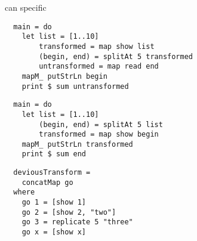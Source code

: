 % 
can
specific
% 
%   
%   
% 
\begin{lstlisting}
  main = do
    let list = [1..10]
        transformed = map show list
        (begin, end) = splitAt 5 transformed
        untransformed = map read end
    mapM_ putStrLn begin
    print $ sum untransformed
\end{lstlisting}
\begin{lstlisting}
  main = do
    let list = [1..10]
        (begin, end) = splitAt 5 list
        transformed = map show begin
    mapM_ putStrLn transformed
    print $ sum end
\end{lstlisting}
\begin{lstlisting}
  deviousTransform =
    concatMap go
  where
    go 1 = [show 1]
    go 2 = [show 2, "two"]
    go 3 = replicate 5 "three"
    go x = [show x]
\end{lstlisting}
